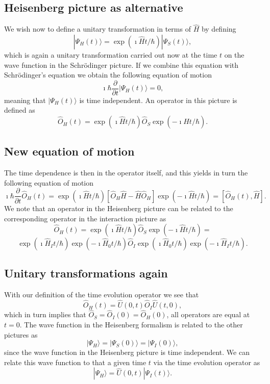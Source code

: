 \documentclass[%
oneside,                 %
final,                   %
10pt]{article}
\begin{document}
\subsection{Heisenberg  picture as alternative}

We wish now to define a unitary transformation in terms of $\hat{H}$ by defining
\[
|\Psi_H(t)\rangle = \exp{(\imath\hat{H}t/\hbar)}|\Psi_S(t)\rangle,
\]
which is again a unitary transformation carried out now at the time $t$ on the 
wave function in the Schrödinger picture. If we combine this equation with 
Schrödinger's equation we obtain the following equation of motion
\[
\imath \hbar\frac{\partial }{\partial t}|\Psi_H(t)\rangle = 0,
\]
meaning that $|\Psi_H(t)\rangle$ is time independent. An operator in this picture is defined as
\[
\hat{O}_H(t)=
\exp{(\imath\hat{H}t/\hbar)}\hat{O}_S\exp{(-\imath\hat{H}t/\hbar)}.
\]

\subsection{New equation of motion}

The time dependence is then in the operator itself, and this yields in turn the
following equation of motion
\[
\imath \hbar\frac{\partial }{\partial t}\hat{O}_H(t) = \exp{(\imath\hat{H}t/\hbar)}\left[\hat{O}_H\hat{H}-\hat{H}\hat{O}_H\right]\exp{(-\imath\hat{H}t/\hbar)}=\left[\hat{O}_H(t),\hat{H}\right].
\]
We note that an operator in the Heisenberg picture can be related to the corresponding
operator in the interaction picture as 
\[
\hat{O}_H(t)=
\exp{(\imath\hat{H}t/\hbar)}\hat{O}_S\exp{(-\imath\hat{H}t/\hbar)}=
\]
\[
\exp{(\imath\hat{H}_It/\hbar)}\exp{(-\imath\hat{H}_0t/\hbar)}\hat{O}_I\exp{(\imath\hat{H}_0t/\hbar)}\exp{(-\imath\hat{H}_It/\hbar)}.
\]

\subsection{Unitary transformations again}

With our definition of the time evolution operator we see that
\[
\hat{O}_H(t)=\hat{U}(0,t)\hat{O}_I\hat{U}(t,0),
\]
which in turn implies that $\hat{O}_S=\hat{O}_I(0)=\hat{O}_H(0)$, all operators are equal at $t=0$. The wave function in the Heisenberg formalism is 
related to the other pictures as 
\[
|\Psi_H\rangle=|\Psi_S(0)\rangle=|\Psi_I(0)\rangle,
\]
since the wave function in the Heisenberg picture is time independent. 
We can relate this wave function to that a given time $t$ via the time evolution operator as
\[
|\Psi_H\rangle=\hat{U}(0,t)|\Psi_I(t)\rangle.
\]
\end{document}
